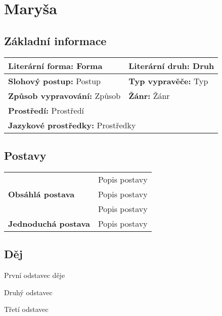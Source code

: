 \section{Maryša}
    \subsection*{Základní informace}
        \begin{center}
            \begin{tabular}{l|l}
                \textbf{Literární forma:} Forma & \textbf{Literární druh:} Druh \\
                \hline
                \textbf{Slohový postup:} Postup & \textbf{Typ vypravěče:} Typ \\
                \hline
                \textbf{Způsob vypravování:} Způsob & \textbf{Žánr:} Žánr \\
                \hline
                \multicolumn{2}{l}{\textbf{Prostředí:} Prostředí} \\
                \hline
                \multicolumn{2}{l}{\textbf{Jazykové prostředky:} Prostředky} \\
            \end{tabular}
        \end{center}
    \subsection*{Postavy}
        \begin{center}
            \begin{tabular}{l|l}
                \multirow{3}{15em}{\textbf{Obsáhlá postava}} & Popis postavy \\
                & Popis postavy \\
                & Popis postavy \\
                \hline
                \textbf{Jednoduchá postava} & Popis postavy \\
            \end{tabular}
        \end{center}
    \subsection*{Děj}
        První odstavec děje

        Druhý odstavec
        
        Třetí odstavec

